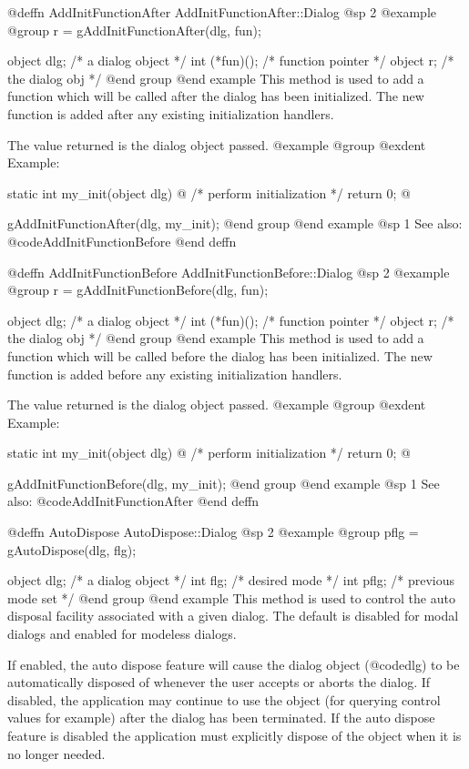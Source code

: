 @deffn {AddInitFunctionAfter} AddInitFunctionAfter::Dialog
@sp 2
@example
@group
r = gAddInitFunctionAfter(dlg, fun);

object  dlg;        /*  a dialog object   */
int     (*fun)();   /*  function pointer  */
object  r;          /*  the dialog obj    */
@end group
@end example
This method is used to add a function which will be called after the dialog
has been initialized.  The new function is added after any existing
initialization handlers.

The value returned is the dialog object passed.
@example
@group
@exdent Example:

static int  my_init(object dlg)
@{
        /*  perform initialization  */
        return 0;
@}

gAddInitFunctionAfter(dlg, my_init);
@end group
@end example
@sp 1
See also:  @code{AddInitFunctionBefore}
@end deffn




@deffn {AddInitFunctionBefore} AddInitFunctionBefore::Dialog
@sp 2
@example
@group
r = gAddInitFunctionBefore(dlg, fun);

object  dlg;        /*  a dialog object   */
int     (*fun)();   /*  function pointer  */
object  r;          /*  the dialog obj    */
@end group
@end example
This method is used to add a function which will be called before the dialog
has been initialized.  The new function is added before any existing
initialization handlers.

The value returned is the dialog object passed.
@example
@group
@exdent Example:

static int  my_init(object dlg)
@{
        /*  perform initialization  */
        return 0;
@}

gAddInitFunctionBefore(dlg, my_init);
@end group
@end example
@sp 1
See also:  @code{AddInitFunctionAfter}
@end deffn




@deffn {AutoDispose} AutoDispose::Dialog
@sp 2
@example
@group
pflg = gAutoDispose(dlg, flg);

object  dlg;    /*  a dialog object    */
int     flg;    /*  desired mode       */
int     pflg;   /*  previous mode set  */
@end group
@end example
This method is used to control the auto disposal facility associated with
a given dialog.  The default is disabled for modal dialogs and enabled
for modeless dialogs.

If enabled, the auto dispose feature will cause the dialog object
(@code{dlg}) to be automatically disposed of whenever the user accepts
or aborts the dialog.  If disabled, the application may continue to use
the object (for querying control values for example) after the dialog
has been terminated.  If the auto dispose feature is disabled the
application must explicitly dispose of the object when it is no longer
needed.

